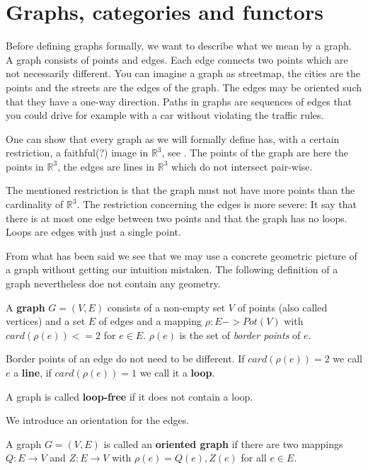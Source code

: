 \section{Graphs, categories and functors}

Before defining graphs formally, we want to describe what we mean by a graph. A
graph consists of points and edges. Each edge connects two points which are not
necessarily different. You can imagine a graph as streetmap, the cities are the
points and the streets are the edges of the graph. The edges may be oriented
such that they have a one-way direction. Paths in graphs are sequences of edges
that you could drive for example with a car without violating the traffic rules.

One can show that every graph as we will formally define has, with a certain
restriction, a faithful(?) image in $\mathbb{R}^3$, see \cite{Wagner}. The
points of the graph are here the points in $\mathbb{R}^3$, the edges are lines
in $\mathbb{R}^3$ which do not intersect pair-wise.

The mentioned restriction is that the graph must not have more points than the
cardinality of $\mathbb{R}^3$. The restriction concerning the edges is more
severe: It say that there is at most one edge between two points and that the
graph has no loops. Loops are edges with just a single point.

From what has been said we see that we may use a concrete geometric picture of
a graph without getting our intuition mistaken. The following definition of a
graph nevertheless doe not contain any geometry.

\begin{definition}
A {\bf graph} $G = (V, E)$ consists of a non-empty set $V$ of points (also
called vertices) and a set $E$ of edges and a mapping $\rho: E -> Pot(V)$ with
$card(\rho(e)) <= 2$ for $e \in E$. $\rho(e)$ is the set of {\em border points}
of $e$.
\end{definition}

Border points of an edge do not need to be different. If $card(\rho(e)) = 2$ we
call $e$ a {\bf line}, if $card(\rho(e)) = 1$ we call it a {\bf loop}.

\begin{definition}
A graph is called {\bf loop-free} if it does not contain a loop.
\end{definition}

We introduce an orientation for the edges. 

\begin{definition}
A graph $G = (V,E)$ is called an {\bf oriented graph} if there are two mappings
$Q : E \to V$ and $Z : E \to V$ with $\rho(e) = {Q(e), Z(e)}$ for all $e \in E$.
\end{definition}

